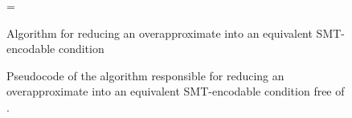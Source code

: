 \begin{figure}[t!]
\begin{algorithm}[H]
\begin{footnotesize}
\DontPrintSemicolon
\everypar={\nl}
\SetAlgoLined
{}
\end{footnotesize}
\caption{Algorithm for reducing an overapproximate \recursiveRelation{} into an equivalent SMT-encodable condition}
\end{algorithm}
\caption{\label{algo:overapprox}Pseudocode of the algorithm responsible for reducing an overapproximate \recursiveRelation{}
into an equivalent SMT-encodable condition free of \recursiveRelations{}.}
\end{figure}